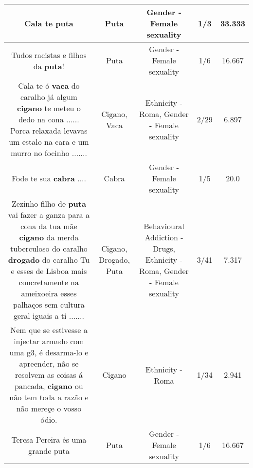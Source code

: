 \documentclass[11pt]{article}
\newlength\mylength
\begin{document}
\begin{center}
\begin{longtable}{|C{.65\mylength}|C{.30\mylength}|C{.12\mylength}|C{.12\mylength}|C{.12\mylength}|}
  \small Cala te puta\normalsize   & Puta & Gender - Female sexuality & 1/3 & 33.333 \\  \hline
  \small Tudos racistas e filhos da \textbf{puta}!\normalsize   & Puta & Gender - Female sexuality & 1/6 & 16.667 \\  \hline
  \small Cala te ó \textbf{vaca} do caralho já algum \textbf{cigano} te meteu o dedo na cona ...... Porca relaxada levavas um estalo na cara e um murro no focinho .......\normalsize   & Cigano, Vaca & Ethnicity - Roma, Gender - Female sexuality & 2/29 & 6.897 \\  \hline
  \small Fode te sua \textbf{cabra} ....\normalsize   & Cabra & Gender - Female sexuality & 1/5 & 20.0 \\  \hline
  \small Zezinho filho de \textbf{puta} vai fazer a ganza para a cona da tua mãe \textbf{cigano} da merda tuberculoso do caralho \textbf{drogado} do caralho Tu e esses de Lisboa mais concretamente na ameixoeira esses palhaços sem cultura geral iguais a ti .......\normalsize   & Cigano, Drogado, Puta & Behavioural Addiction - Drugs, Ethnicity - Roma, Gender - Female sexuality & 3/41 & 7.317 \\  \hline
  \small Nem que se estivesse a injectar armado com uma g3, é desarma-lo e apreender, não se resolvem as coisas á pancada, \textbf{cigano} ou não tem toda a razão e não mereçe o vosso ódio.\normalsize   & Cigano & Ethnicity - Roma & 1/34 & 2.941 \\  \hline
  \small Teresa Pereira  és uma grande puta\normalsize   & Puta & Gender - Female sexuality & 1/6 & 16.667 \\  \hline

\end{longtable}
\end{center}
\end{document}
